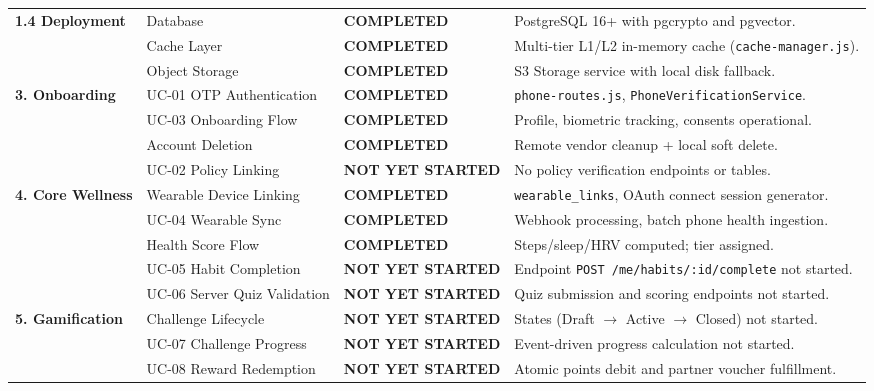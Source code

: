 \documentclass[11pt,a4paper]{article}
\begin{document}
\begin{longtable}{p{4.2cm} p{3.2cm} p{3.2cm} p{4.4cm}}
    \textbf{1.4 Deployment} & Database & \textcolor{statuscompleted}{\textbf{COMPLETED}} & PostgreSQL 16+ with pgcrypto and pgvector. \\
    & Cache Layer & \textcolor{statuscompleted}{\textbf{COMPLETED}} & Multi-tier L1/L2 in-memory cache (\texttt{cache-manager.js}). \\
    & Object Storage & \textcolor{statuscompleted}{\textbf{COMPLETED}} & S3 Storage service with local disk fallback. \\
    \midrule

    \textbf{3. Onboarding} & UC-01 OTP Authentication & \textcolor{statuscompleted}{\textbf{COMPLETED}} & \texttt{phone-routes.js}, \texttt{PhoneVerificationService}. \\
    & UC-03 Onboarding Flow & \textcolor{statuscompleted}{\textbf{COMPLETED}} & Profile, biometric tracking, consents operational. \\
    & Account Deletion & \textcolor{statuscompleted}{\textbf{COMPLETED}} & Remote vendor cleanup + local soft delete. \\
    & UC-02 Policy Linking & \textcolor{statusnotstarted}{\textbf{NOT YET STARTED}} & No policy verification endpoints or tables. \\
    \midrule

    \textbf{4. Core Wellness} & Wearable Device Linking & \textcolor{statuscompleted}{\textbf{COMPLETED}} & \texttt{wearable\_links}, OAuth connect session generator. \\
    & UC-04 Wearable Sync & \textcolor{statuscompleted}{\textbf{COMPLETED}} & Webhook processing, batch phone health ingestion. \\
    & Health Score Flow & \textcolor{statuscompleted}{\textbf{COMPLETED}} & Steps/sleep/HRV computed; tier assigned. \\
    & UC-05 Habit Completion & \textcolor{statusnotstarted}{\textbf{NOT YET STARTED}} & Endpoint \texttt{POST /me/habits/:id/complete} not started. \\
    & UC-06 Server Quiz Validation & \textcolor{statusnotstarted}{\textbf{NOT YET STARTED}} & Quiz submission and scoring endpoints not started. \\
    \midrule

    \textbf{5. Gamification} & Challenge Lifecycle & \textcolor{statusnotstarted}{\textbf{NOT YET STARTED}} & States (Draft $\to$ Active $\to$ Closed) not started. \\
    & UC-07 Challenge Progress & \textcolor{statusnotstarted}{\textbf{NOT YET STARTED}} & Event-driven progress calculation not started. \\
    & UC-08 Reward Redemption & \textcolor{statusnotstarted}{\textbf{NOT YET STARTED}} & Atomic points debit and partner voucher fulfillment. \\
    \midrule


\end{longtable}
\end{document}
